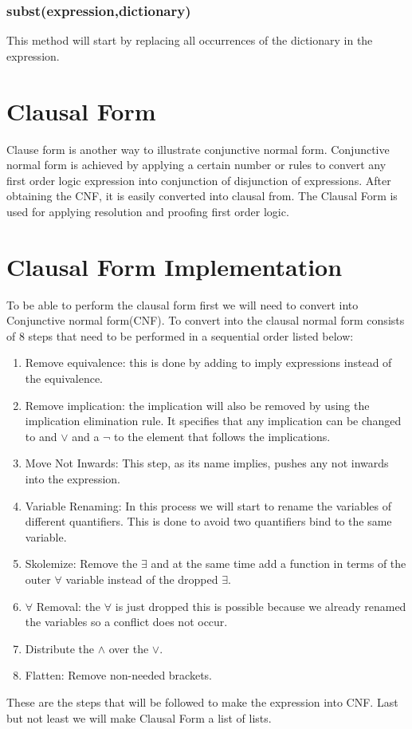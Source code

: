 \subsubsection{subst(expression,dictionary)}
This method will start by replacing all occurrences of the dictionary in the expression.

\section{Clausal Form}
Clause form is another way to illustrate conjunctive normal form. Conjunctive normal form is achieved by applying a certain number or rules to convert any first order logic expression into conjunction of disjunction of expressions. After obtaining the CNF, it is easily converted into clausal from. The Clausal Form is used for applying resolution and proofing first order logic.


\section{Clausal Form Implementation}
To be able to perform the clausal form first we will need to convert into Conjunctive normal form(CNF). To convert into the clausal normal form consists of 8 steps that need to be performed in a sequential order listed below:

\begin{enumerate}
\item{Remove equivalence: this is done by adding to imply expressions instead of the equivalence.}
\item{Remove implication: the implication will also be removed by using the implication elimination rule. It specifies that any implication can be changed to and $\vee$ and a $\neg$ to the element that follows the implications.}
\item{Move Not Inwards: This step, as its name implies, pushes any not inwards into the expression.}
\item{Variable Renaming: In this process we will start to rename the variables of different quantifiers. This is done to avoid two quantifiers bind to the same variable.}
\item{Skolemize: Remove the $\exists$ and at the same time add a function in terms of the outer $\forall$ variable instead of the dropped $\exists$.}
\item{$\forall$ Removal: the $\forall$ is just dropped this is possible because we already renamed the variables so a conflict does not occur.}
\item{Distribute the $\wedge$ over the $\vee$.}
\item{Flatten: Remove non-needed brackets.}
\end{enumerate}
These are the steps that will be followed to make the expression into CNF. Last but not least we will make Clausal Form a list of lists.

